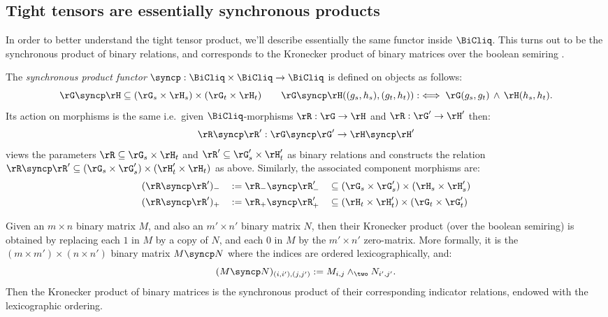 \documentclass{article}
\begin{document}
\subsection{Tight tensors are essentially synchronous products}


In order to better understand the tight tensor product, we'll describe essentially the same functor inside $\BiCliq$. This turns out to be the synchronous product of binary relations, and corresponds to the Kronecker product of binary matrices over the boolean semiring \cite{WattsBooleanRankKronecker2001}.


\begin{definition}
\label{def:sync_product}
The \emph{synchronous product functor} $\syncp : \BiCliq \times \BiCliq \to \BiCliq$ is defined on objects as follows:
\[
\rG \syncp \rH \subseteq (\rG_s \times \rH_s) \times (\rG_t \times \rH_t)
\qquad
\rG \syncp \rH ((g_s, h_s), (g_t, h_t)) :\iff \rG(g_s, g_t) \,\land\, \rH(h_s, h_t).
\]
Its action on morphisms is the same i.e.\ given $\BiCliq$-morphisms $\rR : \rG \to \rH$ and $\rR : \rG' \to \rH'$ then:
\[
\rR \syncp \rR' : \rG \syncp \rG' \to \rH \syncp \rH'
\]
views the parameters $\rR \subseteq \rG_s \times \rH_t$ and $\rR' \subseteq \rG'_s \times \rH'_t$ as binary relations and constructs the relation $\rR \syncp \rR' \subseteq (\rG_s \times \rG'_s) \times (\rH'_t \times \rH_t)$ as above. Similarly, the associated component morphisms are:
\[
\begin{tabular}{llll}
$(\rR \syncp \rR')_-$ 
& $:= \rR_- \syncp \rR'_-$
& $\subseteq (\rG_s \times \rG'_s) \times (\rH_s \times \rH'_s)$
\\[1ex]
$(\rR \syncp \rR')_+$
& $:= \rR_+ \syncp \rR'_+$
& $\subseteq (\rH_t \times \rH'_t) \times (\rG_t \times \rG'_t)$
\end{tabular}
\]
\endbox
\end{definition}

\begin{note}
\item
Given an $m \times n$ binary matrix $M$, and also an $m' \times n'$ binary matrix $N$, then their Kronecker product (over the boolean semiring) is obtained by replacing each $1$ in $M$ by a copy of $N$, and each $0$ in $M$ by the $m' \times n'$ zero-matrix. More formally, it is the $(m \times m') \times (n \times n')$ binary matrix $M \syncp N$ where the indices are ordered lexicographically, and:
\[
(M \syncp N)_{(i,i'),(j,j')} := M_{i,j} \land_\two N_{i',j'}.
\]
Then the Kronecker product of binary matrices is the synchronous product of their corresponding indicator relations, endowed with the lexicographic ordering. \endbox
\end{note}
\end{document}
